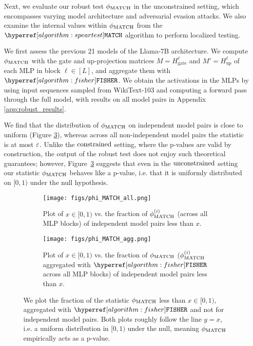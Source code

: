 Next, we evaluate our robust test $\phi_{\textup{MATCH}}$ in the unconstrained setting, which encompasses varying model architecture and adversarial evasion attacks. We also examine the internal values within $\phi_{\textup{MATCH}}$ from the $\speartest$ algorithm to perform localized testing.

We first assess the previous 21 models of the Llama-7B architecture. We compute $\phi_{\textup{MATCH}}$ with the gate and up-projection matrices $M = H_\text{gate}^{\ell}$ and $M' = H_\text{up}^{\ell}$ of each MLP in block $\ell \in [L]$, and aggregate them with $\fisher$. We obtain the activations in the MLPs by using input sequences sampled from WikiText-103 and computing a forward pass through the full model, 
with results on all model pairs in Appendix \ref{app:robust_results}. 

We find that the distribution of $\phi_{\textup{MATCH}}$ on independent model pairs is close to uniform 
(Figure \ref{fig:phimatchlines}), whereas across all non-independent model pairs the statistic is at most $\varepsilon$. 
Unlike the $\textup{constrained}$ setting, where the p-values are valid by construction, the output of the robust test does not enjoy such theoretical guarantees; however, Figure~\ref{fig:phimatchlines} suggests that even in the $\textup{unconstrained}$ setting our statistic $\phi_{\textup{MATCH}}$ behaves like a p-value, i.e. that it is uniformly distributed on $[0,1)$ under the null hypothesis. 

\begin{figure}[h]
\centering
  \begin{subfigure}[]{0.45\textwidth}
    \texttt{[image: figs/phi\_MATCH\_all.png]}
    \caption{Plot of $x \in [0,1)$ vs. the fraction of $\phi_{\textup{MATCH}}^{(i)}$ (across all MLP blocks) of independent model pairs less than $x$.}
    \label{fig:robust_stat_all}
  \end{subfigure}
  \begin{subfigure}[]{0.45\textwidth}
    \texttt{[image: figs/phi\_MATCH\_agg.png]}
    \caption{Plot of $x \in [0,1)$ vs. the fraction of $\phi_{\textup{MATCH}}$ ($\phi_{\textup{MATCH}}^{(i)}$ aggregated with $\fisher$ across all MLP blocks) of independent model pairs less than $x$.}
    \label{fig:robust_stat_agg}
  \end{subfigure}
  \caption{We plot the fraction of the statistic $\phi_{\textup{MATCH}}$ less than $x \in [0,1)$, aggregated with $\fisher$ and not for independent model pairs. Both plots roughly follow the line $y=x$, i.e. a uniform distribution in $[0,1)$ under the null, meaning $\phi_{\textup{MATCH}}$ empirically acts as a p-value.}
  \label{fig:phimatchlines}
\end{figure}

